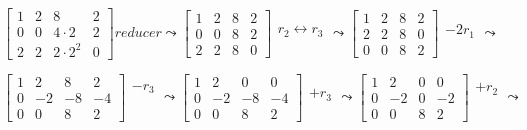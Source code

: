 \documentclass[a4paper,12pt]{article}
\begin{document}
$
\left[\begin{array}{ccc|c}
    1 & 2 & 8 & 2 \\
    0 & 0 & 4\cdot2 & 2 \\
    2 & 2 & 2\cdot2^2 & 0
\end{array}\right]
reducer
\leadsto
\left[\begin{array}{ccc|c}
    1 & 2 & 8 & 2 \\
    0 & 0 & 8 & 2 \\
    2 & 2 & 8 & 0
\end{array}\right]
\begin{array}{ccc}
    \\
    r_2\leftrightarrow r_3\\
    \\
\end{array}
\leadsto
\left[\begin{array}{ccc|c}
    1 & 2 & 8 & 2 \\
    2 & 2 & 8 & 0 \\
    0 & 0 & 8 & 2
\end{array}\right]
\begin{array}{ccc}
    \\
    -2r_1\\
    \\
\end{array}
\leadsto
$

$
\left[\begin{array}{ccc|c}
    1 & 2 & 8 & 2 \\
    0 & -2 & -8 & -4 \\
    0 & 0 & 8 & 2
\end{array}\right]
\begin{array}{ccc}
    -r_3\\
    \\
    \\
\end{array}
\leadsto
\left[\begin{array}{ccc|c}
    1 & 2 & 0 & 0 \\
    0 & -2 & -8 & -4 \\
    0 & 0 & 8 & 2
\end{array}\right]
\begin{array}{ccc}
    \\
    +r_3\\
    \\
\end{array}
\leadsto
\left[\begin{array}{ccc|c}
    1 & 2 & 0 & 0 \\
    0 & -2 & 0 & -2 \\
    0 & 0 & 8 & 2
\end{array}\right]
\begin{array}{ccc}
    +r_2\\
    \\
    \\
\end{array}
\leadsto
$
\end{document}
